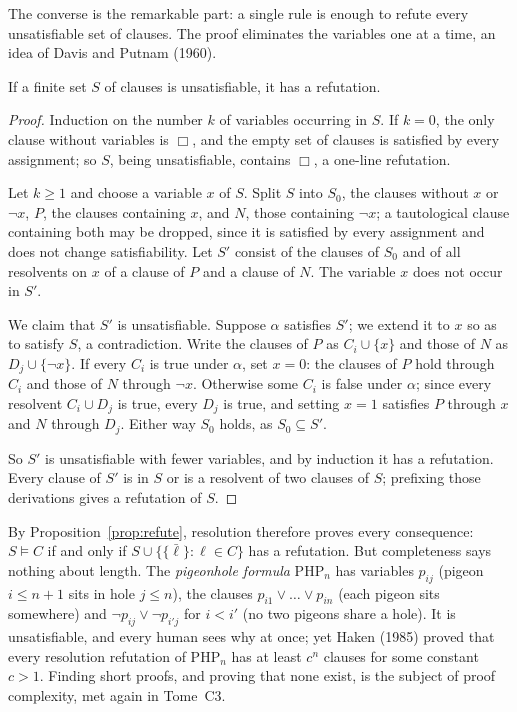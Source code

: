 The converse is the remarkable part: a single rule is enough to refute every unsatisfiable set of clauses. The proof
eliminates the variables one at a time, an idea of Davis and Putnam (1960).

\begin{theorem}\label{thm:rescomplete}
If a finite set $S$ of clauses is unsatisfiable, it has a refutation.
\end{theorem}
\begin{proof}
Induction on the number $k$ of variables occurring in $S$. If $k=0$, the only clause without variables is $\Box$, and the empty set
of clauses is satisfied by every assignment; so $S$, being unsatisfiable, contains $\Box$, a one-line refutation.

Let $k\ge1$ and choose a variable $x$ of $S$. Split $S$ into $S_0$, the clauses without $x$ or $\neg x$, $P$, the clauses containing $x$,
and $N$, those containing $\neg x$; a tautological clause containing both may be dropped, since it is satisfied by every
assignment and does not change satisfiability. Let $S'$ consist of the clauses of $S_0$ and of all resolvents on $x$ of a clause of $P$ and a clause of $N$. The
variable $x$ does not occur in $S'$.

We claim that $S'$ is unsatisfiable. Suppose $\alpha$ satisfies $S'$; we extend it to $x$ so as to satisfy $S$, a contradiction. Write
the clauses of $P$ as $C_i\cup\{x\}$ and those of $N$ as $D_j\cup\{\neg x\}$. If every $C_i$ is true under $\alpha$, set $x=0$: the clauses of $P$ hold
through $C_i$ and those of $N$ through $\neg x$. Otherwise some $C_i$ is false under $\alpha$; since every resolvent $C_i\cup D_j$ is true,
every $D_j$ is true, and setting $x=1$ satisfies $P$ through $x$ and $N$ through $D_j$. Either way $S_0$ holds, as $S_0\subseteq S'$.

So $S'$ is unsatisfiable with fewer variables, and by induction it has a refutation. Every clause of $S'$ is in $S$ or is a
resolvent of two clauses of $S$; prefixing those derivations gives a refutation of $S$.
\end{proof}

By Proposition~\ref{prop:refute}, resolution therefore proves every consequence: $S\models C$ if and only if $S\cup\{\{\bar\ell\}:\ell\in C\}$
has a refutation. But completeness says nothing about length. The \emph{pigeonhole formula} $\mathrm{PHP}_n$ has variables
$p_{ij}$ (pigeon $i\le n+1$ sits in hole $j\le n$), the clauses $p_{i1}\lor\dots\lor p_{in}$ (each pigeon sits somewhere) and $\neg p_{ij}\lor\neg p_{i'j}$ for
$i<i'$ (no two pigeons share a hole). It is unsatisfiable, and every human sees why at once; yet Haken (1985) proved
that every resolution refutation of $\mathrm{PHP}_n$ has at least $c^n$ clauses for some constant $c>1$. Finding short proofs, and proving
that none exist, is the subject of proof complexity, met again in Tome~C3.

